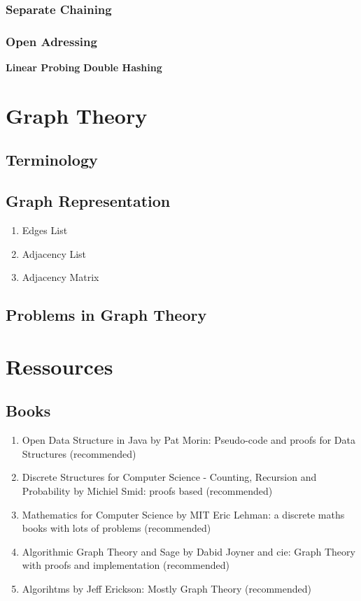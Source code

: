 \documentclass{article}
\begin{document}
\subsubsection{Separate Chaining}
\subsubsection{Open Adressing}

\textbf{Linear Probing}
\textbf{Double Hashing}

\section{Graph Theory}

\subsection{Terminology}
\subsection{Graph Representation}

\begin{enumerate}
    \item Edges List
    \item Adjacency List
    \item Adjacency Matrix
\end{enumerate}

\subsection{Problems in Graph Theory}

\section*{Ressources}%
\label{sec:Ressources}

\subsection{Books}%
\label{sub:Books}

\begin{enumerate}
    \item Open Data Structure in Java by Pat Morin: Pseudo-code and proofs
	for Data Structures (recommended)
    \item Discrete Structures for Computer Science - Counting, Recursion
	and Probability by Michiel Smid: proofs based (recommended)
    \item Mathematics for Computer Science by MIT Eric Lehman: a
	discrete maths books with lots of problems (recommended)
    \item Algorithmic Graph Theory and Sage by Dabid Joyner and cie:
	Graph Theory with proofs and implementation (recommended)
    \item Algorihtms by Jeff Erickson: Mostly Graph Theory (recommended)
\end{enumerate}
\end{document}
